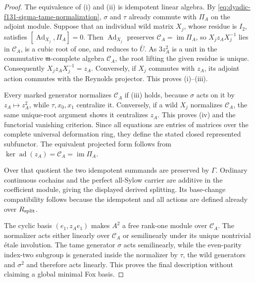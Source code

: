 \begin{proof}
The equivalence of (i)
and (ii) is idempotent
linear algebra.
By
\eqref{eq:dyadic-f131-sigma-tame-normalization},
$\sigma$ and $\tau$
already commute with
$\Pi_A$ on the adjoint
module.
Suppose that an individual
wild matrix $X_j$, whose
residue is $I_2$, satisfies
$[\operatorname{Ad}_{X_j},\Pi_A]=0$.
Then $\operatorname{Ad}_{X_j}$
preserves
$\mathcal C_A=\operatorname{im}\Pi_A$,
so $X_j z_A X_j^{-1}$
lies in $\mathcal C_A$,
is a cubic root of one,
and reduces to $\bar U$.
As $3z_A^2$ is a unit
in the commutative
$\mathfrak m$-complete
algebra $\mathcal C_A$,
the root lifting the given
residue is unique.
Consequently
$X_jz_AX_j^{-1}=z_A$.
Conversely, if $X_j$
commutes with $z_A$,
its adjoint action
commutes with the
Reynolds projector.
This proves (i)--(iii).

Every marked generator
normalizes $\mathcal C_A$
if (iii) holds, because
$\sigma$ acts on it by
$z_A\mapsto z_A^2$,
while $\tau,x_0,x_1$
centralize it.
Conversely, if a wild
$X_j$ normalizes
$\mathcal C_A$, the
same unique-root argument
shows it centralizes $z_A$.
This proves (iv) and the
functorial vanishing
criterion.
Since all equations are
entries of matrices over
the complete universal
deformation ring,
they define the stated
closed represented subfunctor.
The equivalent projected
form follows from
$\ker\operatorname{ad}(z_A)
=\mathcal C_A=\operatorname{im}\Pi_A$.

Over that quotient the two
idempotent summands are
preserved by $\Gamma$.
Ordinary continuous cochains
and the perfect all-Sylow
carrier are additive in
the coefficient module,
giving the displayed
derived splitting.
Its base-change
compatibility follows
because the idempotent and
all actions are defined
already over $R_{\rm split}$.

The cyclic basis
$(e_1,z_Ae_1)$ makes
$A^2$ a free rank-one
module over $\mathcal C_A$.
The normalizer acts either
linearly over $\mathcal C_A$
or semilinearly under its
unique nontrivial étale
involution.  The tame
generator $\sigma$ acts
semilinearly, while the
even-parity index-two
subgroup is generated
inside the normalizer
by $\tau$, the wild
generators and
$\sigma^2$ and therefore
acts linearly.
This proves the final
description without
claiming a global
minimal Fox basis.
\end{proof}

